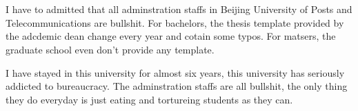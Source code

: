 \begin{titlepage}

    \pagestyle{empty}

    \begin{spacing}{1.05}
        \centering
        \parbox[c]{.75\textwidth}{}
    \end{spacing}

    \begin{spacing}{1.5}
        \centering
        \sanhao\quad{} \\ 
         \\ 
    \end{spacing}
    \xiaosanhao\quad{}
    \normalsize

    I have to admitted that all adminstration staffs in Beijing University of Posts and Telecommunications are bullshit.
    For bachelors, the thesis template provided by the adcdemic dean change every year and cotain some typos.
    For matsers, the graduate school even don't provide any template. 

    I have stayed in this university for almost six years, this university has seriously addicted to bureaucracy.
    The adminstration staffs are all bullshit, the only thing they do everyday is just eating and tortureing students as they can.
    \quad{}

    \par\noindent{}\quad{}%
\end{titlepage}

\thispagestyle{empty}